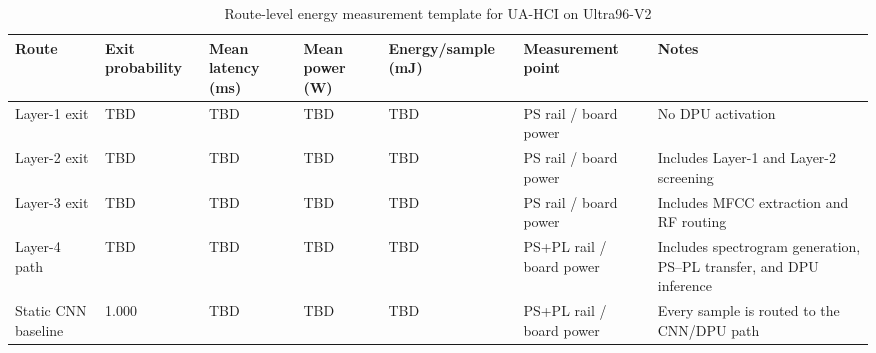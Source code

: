 \begin{table}[!t]
\centering
\caption{Route-level energy measurement template for UA-HCI on Ultra96-V2}
\label{tab:energy_model}
\footnotesize
\setlength{\tabcolsep}{3pt}
\renewcommand{\arraystretch}{1.15}
\begin{tabularx}{\textwidth}{@{}p{2.0cm}p{1.8cm}p{1.8cm}p{1.8cm}p{1.8cm}p{1.9cm}X@{}}
\toprule
\textbf{Route} & \textbf{Exit probability} & \textbf{Mean latency (ms)} & \textbf{Mean power (W)} & \textbf{Energy/sample (mJ)} & \textbf{Measurement point} & \textbf{Notes} \\
\midrule
Layer-1 exit & TBD & TBD & TBD & TBD & PS rail / board power & No DPU activation \\
Layer-2 exit & TBD & TBD & TBD & TBD & PS rail / board power & Includes Layer-1 and Layer-2 screening \\
Layer-3 exit & TBD & TBD & TBD & TBD & PS rail / board power & Includes MFCC extraction and RF routing \\
Layer-4 path & TBD & TBD & TBD & TBD & PS+PL rail / board power & Includes spectrogram generation, PS--PL transfer, and DPU inference \\
Static CNN baseline & 1.000 & TBD & TBD & TBD & PS+PL rail / board power & Every sample is routed to the CNN/DPU path \\
\bottomrule
\end{tabularx}
\end{table}
